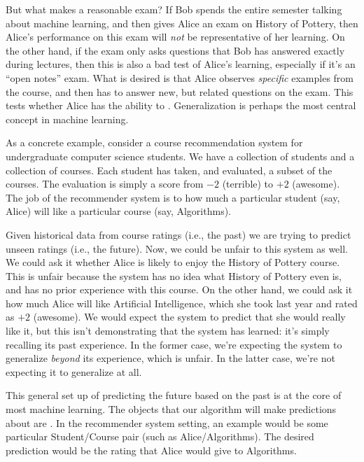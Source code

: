 But what makes a reasonable exam?  If Bob spends the entire semester
talking about machine learning, and then gives Alice an exam on
History of Pottery, then Alice's performance on this exam will
\emph{not} be representative of her learning.  On the other hand, if
the exam only asks questions that Bob has answered exactly during lectures,
then this is also a bad test of Alice's learning, especially if it's
an ``open notes'' exam.  What is desired is that Alice observes
\emph{specific} examples from the course, and then has to answer new, but
related questions on the exam.  This tests whether Alice has the
ability to .  Generalization is perhaps the most
central concept in machine learning.

As a concrete example, consider a
course recommendation system for undergraduate computer science
students.  We have a collection of students and a collection of
courses.  Each student has taken, and evaluated, a subset of the
courses.  The evaluation is simply a score from $-2$ (terrible) to
$+2$ (awesome).  The job of the recommender system is to
 how much a particular student (say, Alice) will like
a particular course (say, Algorithms).

Given historical data from course ratings (i.e., the past) we are
trying to predict unseen ratings (i.e., the future).  Now, we could be
unfair to this system as well.  We could ask it whether Alice is
likely to enjoy the History of Pottery course.  This is unfair because
the system has no idea what History of Pottery even is, and has no
prior experience with this course.  On the other hand, we could ask it
how much Alice will like Artificial Intelligence, which she took last
year and rated as $+2$ (awesome).  We would expect the system to
predict that she would really like it, but this isn't demonstrating
that the system has learned: it's simply recalling its past
experience.  In the former case, we're expecting the system to
generalize \emph{beyond} its experience, which is unfair.  In the
latter case, we're not expecting it to generalize at all.

This general set up of predicting the future based on the past is at
the core of most machine learning.  The objects that our algorithm
will make predictions about are .  In the
recommender system setting, an example would be some particular
Student/Course pair (such as Alice/Algorithms).  The desired
prediction would be the rating that Alice would give to Algorithms.


